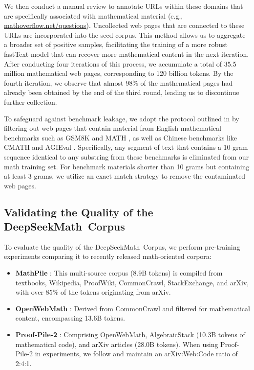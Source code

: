 We then conduct a manual review to annotate URLs within these domains that are specifically associated with mathematical material (e.g., \url{mathoverflow.net/questions}). Uncollected web pages that are connected to these URLs are incorporated into the seed corpus. This method allows us to aggregate a broader set of positive samples, facilitating the training of a more robust fastText model that can recover more mathematical content in the next iteration. After conducting four iterations of this process, we accumulate a total of 35.5 million mathematical web pages, corresponding to 120 billion tokens. By the fourth iteration, we observe that almost 98\% of the mathematical pages had already been obtained by the end of the third round, leading us to discontinue further collection.

To safeguard against benchmark leakage, we adopt the protocol outlined in \cite{deepseek-coder} by filtering out web pages that contain material from English mathematical benchmarks such as GSM8K \citep{gsm8k} and MATH \citep{MATH}, as well as Chinese benchmarks like CMATH \citep{wei2023cmath} and AGIEval \citep{agieval}. Specifically, any segment of text that contains a 10-gram sequence identical to any substring from these benchmarks is eliminated from our math training set. For benchmark materials shorter than 10 grams but containing at least 3 grams, we utilize an exact match strategy to remove the contaminated web pages.

\subsection{Validating the Quality of the DeepSeekMath~Corpus}

To evaluate the quality of the DeepSeekMath~Corpus, we perform pre-training experiments comparing it to recently released math-oriented corpora:

\begin{itemize}[topsep=0pt]
    \item \textbf{MathPile} \citep{mathpile}: This multi-source corpus (8.9B tokens) is compiled from textbooks, Wikipedia, ProofWiki, CommonCrawl, StackExchange, and arXiv, with over 85\% of the tokens originating from arXiv.
    \item \textbf{OpenWebMath} \citep{openwebmath}: Derived from CommonCrawl and filtered for mathematical content, encompassing 13.6B tokens.
    \item \textbf{Proof-Pile-2} \citep{llemma}: Comprising OpenWebMath, AlgebraicStack (10.3B tokens of mathematical code), and arXiv articles (28.0B tokens). When using Proof-Pile-2 in experiments, we follow \cite{llemma} and maintain an arXiv:Web:Code ratio of 2:4:1.
\end{itemize}

